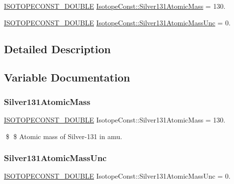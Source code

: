 \begin{DoxyCompactItemize}
\item 
\mbox{\hyperlink{group___isotope_const-_macros_ga8f45a7272ce02c0b4c65c44636ed719a}{I\+S\+O\+T\+O\+P\+E\+C\+O\+N\+S\+T\+\_\+\+D\+O\+U\+B\+LE}} \mbox{\hyperlink{group___isotope_const-_silver-_ag131_gae604bab4dd6951cd8c780e4b8ae3a752}{Isotope\+Const\+::\+Silver131\+Atomic\+Mass}} = 130.
\item 
\mbox{\hyperlink{group___isotope_const-_macros_ga8f45a7272ce02c0b4c65c44636ed719a}{I\+S\+O\+T\+O\+P\+E\+C\+O\+N\+S\+T\+\_\+\+D\+O\+U\+B\+LE}} \mbox{\hyperlink{group___isotope_const-_silver-_ag131_ga9a1a116b30cc1cd8479dce25126e7dc3}{Isotope\+Const\+::\+Silver131\+Atomic\+Mass\+Unc}} = 0.
\end{DoxyCompactItemize}


\subsection{Detailed Description}


\subsection{Variable Documentation}
\mbox{\label{group___isotope_const-_silver-_ag131_gae604bab4dd6951cd8c780e4b8ae3a752}} 
\subsubsection{\texorpdfstring{Silver131\+Atomic\+Mass}{Silver131AtomicMass}}
{\footnotesize\ttfamily \mbox{\hyperlink{group___isotope_const-_macros_ga8f45a7272ce02c0b4c65c44636ed719a}{I\+S\+O\+T\+O\+P\+E\+C\+O\+N\+S\+T\+\_\+\+D\+O\+U\+B\+LE}} Isotope\+Const\+::\+Silver131\+Atomic\+Mass = 130.}

\$ \$ Atomic mass of Silver-\/131 in amu. \mbox{\label{group___isotope_const-_silver-_ag131_ga9a1a116b30cc1cd8479dce25126e7dc3}} 
\subsubsection{\texorpdfstring{Silver131\+Atomic\+Mass\+Unc}{Silver131AtomicMassUnc}}
{\footnotesize\ttfamily \mbox{\hyperlink{group___isotope_const-_macros_ga8f45a7272ce02c0b4c65c44636ed719a}{I\+S\+O\+T\+O\+P\+E\+C\+O\+N\+S\+T\+\_\+\+D\+O\+U\+B\+LE}} Isotope\+Const\+::\+Silver131\+Atomic\+Mass\+Unc = 0.}

